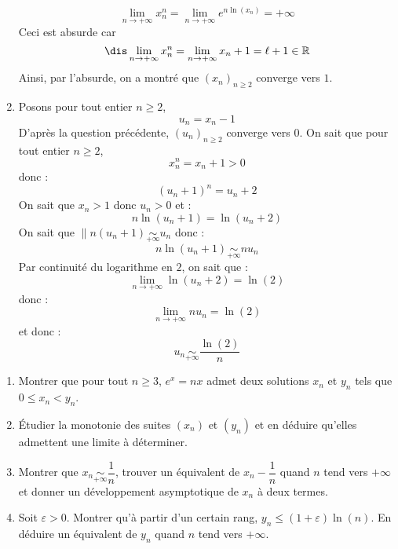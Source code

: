 \documentclass[a4paper,10pt]{report}
\begin{document}
\begin{enumerate}
\[ \lim_{n \rightarrow + \infty} x_n^n = \lim_{n \rightarrow + \infty} e^{n \ln(x_n)} = + \infty \]
Ceci est absurde car 
$$\dis \lim_{n \rightarrow + \infty} x_n^n = \lim_{n \rightarrow + \infty} x_n + 1 = \ell + 1 \in \mathbb{R}$$
Ainsi, par l'absurde, on a montré que $(x_n)_{n \geq 2}$ converge vers $1$.
\item Posons pour tout entier $n \geq 2$, 
$$ u_n = x_n -1$$
D'après la question précédente, $(u_n)_{n \geq 2}$ converge vers $0$.  On sait que pour tout entier $n \geq 2$,
$$ x_n^n = x_n + 1 >0$$
donc :
$$ (u_n+1)^n = u_n +2 $$
On sait que $x_n>1$ donc $u_n>0$ et :
$$ n \ln(u_n + 1) = \ln(u_n+2)$$
On sait que $\|n(u_n+1) \underset{+ \infty}{\sim} u_n$ donc :
$$ n \ln(u_n + 1) \underset{+ \infty}{\sim} nu_n$$
Par continuité du logarithme en $2$, on sait que :
$$ \lim_{n \rightarrow + \infty} \ln(u_n+2) = \ln(2)$$
donc :
$$ \lim_{n \rightarrow + \infty} n u_n = \ln(2)$$
et donc :
$$ u_n \underset{+ \infty}{\sim} \dfrac{\ln(2)}{n}$$
\end{enumerate}




\begin{Exercice}{} \begin{enumerate}
\item Montrer que pour tout $n \geq 3$, $e^x=nx$ admet deux solutions $x_n$ et $y_n$ tels que $0 \leq x_n <y_n$.
\item Étudier la monotonie des suites $(x_n)$ et $(y_n)$ et en déduire qu'elles admettent une limite à déterminer.
\item Montrer que $x_n \underset{+ \infty}{\sim} \dfrac{1}{n}$, trouver un équivalent de $x_n - \dfrac{1}{n}$ quand $n$ tend vers $+ \infty$ et donner un développement asymptotique de $x_n$ à deux termes.
\item Soit $\varepsilon >0$. Montrer qu'à partir d'un certain rang, $y_n \leq (1+ \varepsilon) \ln(n)$. En déduire un équivalent de $y_n$ quand $n$ tend vers $+ \infty$.
\end{enumerate}
\end{Exercice}
\end{document}
